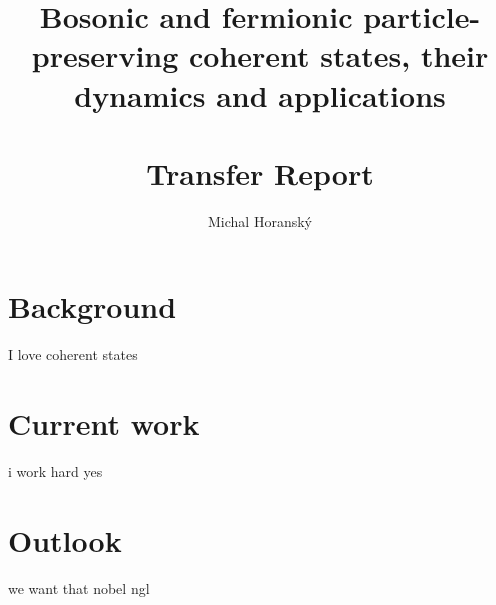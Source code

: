 \documentclass[12pt]{report}
\begin{document}
	\title{Bosonic and fermionic particle-preserving coherent states, their dynamics and applications\\\hfill\\Transfer Report}
	\author{Michal Horanský}
	\maketitle
	
	\tableofcontents
	
	\chapter{Background}
	
	I love coherent states
	
	
	
	
	
	
	
	
	
	
	
	
	
	
	
	\chapter{Current work}
	i work hard yes
	
	
	
	
	
	
	
	
	
	\chapter{Outlook}
	
	we want that nobel ngl
	
	
	
\end{document}
